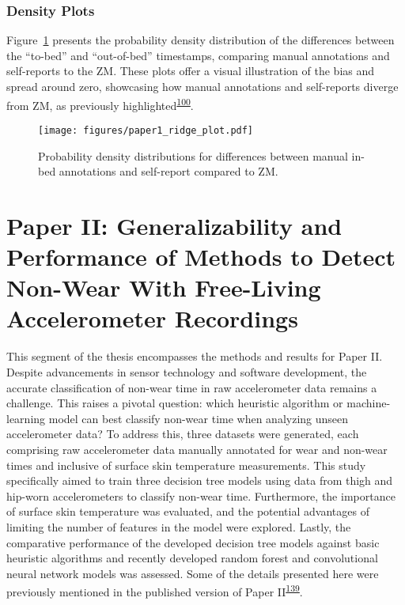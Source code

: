 \documentclass[
  10pt,
]{scrbook}
\begin{document}
\hypertarget{density-plots}{%
\subsection{Density Plots}\label{density-plots}}

Figure~\ref{fig-ridge_plot} presents the probability density
distribution of the differences between the ``to-bed'' and
``out-of-bed'' timestamps, comparing manual annotations and self-reports
to the ZM. These plots offer a visual illustration of the bias and
spread around zero, showcasing how manual annotations and self-reports
diverge from ZM, as previously
highlighted\textsuperscript{\protect\hyperlink{ref-van_hees_estimating_2018}{100}}.

\begin{figure}

{\centering \texttt{[image: figures/paper1\_ridge\_plot.pdf]}

}

\caption{\label{fig-ridge_plot}Probability density distributions for
differences between manual in-bed annotations and self-report compared
to ZM.}

\end{figure}

\hypertarget{paper-ii-generalizability-and-performance-of-methods-to-detect-non-wear-with-free-living-accelerometer-recordings}{%
\chapter{Paper II: Generalizability and Performance of Methods to Detect
Non-Wear With Free-Living Accelerometer
Recordings}\label{paper-ii-generalizability-and-performance-of-methods-to-detect-non-wear-with-free-living-accelerometer-recordings}}

This segment of the thesis encompasses the methods and results for Paper
II. Despite advancements in sensor technology and software development,
the accurate classification of non-wear time in raw accelerometer data
remains a challenge. This raises a pivotal question: which heuristic
algorithm or machine-learning model can best classify non-wear time when
analyzing unseen accelerometer data? To address this, three datasets
were generated, each comprising raw accelerometer data manually
annotated for wear and non-wear times and inclusive of surface skin
temperature measurements. This study specifically aimed to train three
decision tree models using data from thigh and hip-worn accelerometers
to classify non-wear time. Furthermore, the importance of surface skin
temperature was evaluated, and the potential advantages of limiting the
number of features in the model were explored. Lastly, the comparative
performance of the developed decision tree models against basic
heuristic algorithms and recently developed random forest and
convolutional neural network models was assessed. Some of the details
presented here were previously mentioned in the published version of
Paper
II\textsuperscript{\protect\hyperlink{ref-skovgaard_generalizability_2023}{139}}.
\end{document}
